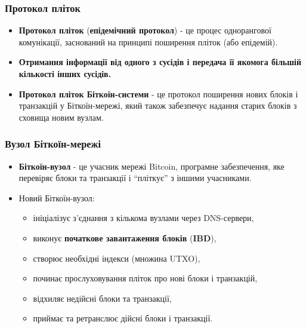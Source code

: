 \documentclass{beamer}
\begin{document}
\begin{frame}
  \frametitle{Протокол пліток}
  \begin{itemize}
  \item \textbf{Протокол пліток} (\textbf{епідемічний протокол}) - це процес
    однорангової комунікації, заснований на принципі поширення пліток (або
    епідемій).
  \item \textbf{Отримання інформації від одного з сусідів і передача її
      якомога більшій кількості інших сусідів.}
  \item \textbf{Протокол пліток Біткоїн-системи} - це протокол поширення нових
    блоків і транзакцій у Біткоїн-мережі, який також забезпечує надання старих
    блоків з сховища новим вузлам.
  \end{itemize}
  \begin{center}
  \end{center}
\end{frame}

\begin{frame}
  \frametitle{Вузол Біткоїн-мережі}
  \begin{itemize}
  \item \textbf{Біткоїн-вузол} - це учасник мережі Bitcoin, програмне
    забезпечення, яке перевіряє блоки та транзакції і ``пліткує'' з іншими
    учасниками.
  \item Новий Біткоїн-вузол:
    \begin{itemize}
    \item ініціалізує з'єднання з кількома вузлами через DNS-сервери,
    \item виконує \textbf{початкове завантаження блоків} (\textbf{IBD}),
    \item створює необхідні індекси (множина UTXO),
    \item починає прослуховування пліток про нові блоки і транзакцій,
    \item відхиляє недійсні блоки та транзакції,
    \item приймає та ретранслює дійсні блоки і транзакції.
    \end{itemize}
  \end{itemize}
\end{frame}
\end{document}
